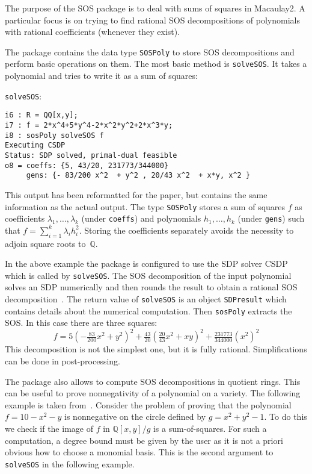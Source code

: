 \documentclass[11pt]{amsart}
\theoremstyle{plain}%
\theoremstyle{definition}
\theoremstyle{remark}
\newcommand{\SOS}{\textsc{SOS}\xspace}
\newcommand{\QQ}{\mathbb{Q}}
\begin{document}
The purpose of the \SOS package is to deal with sums of squares in Macaulay2.
A particular focus is on trying to find rational SOS decompositions of polynomials with rational coefficients (whenever they exist).

The package contains the data type \verb|SOSPoly| to store SOS decompositions and perform basic operations on them.
The most basic method is \verb|solveSOS|.
It takes a polynomial and tries to write it as a sum of squares:
{\small
\verb|solveSOS|:
\begin{verbatim}
i6 : R = QQ[x,y];
i7 : f = 2*x^4+5*y^4-2*x^2*y^2+2*x^3*y;
i8 : sosPoly solveSOS f
Executing CSDP
Status: SDP solved, primal-dual feasible
o8 = coeffs: {5, 43/20, 231773/344000}              
     gens: {- 83/200 x^2  + y^2 , 20/43 x^2  + x*y, x^2 }
\end{verbatim}
}
This output has been reformatted for the paper, but contains the same information as the actual output.
The type \verb|SOSPoly| stores a sum of squares $f$ as coefficients $\lambda_{1},\dots,\lambda_{k}$ (under \verb|coeffs|) and polynomials $h_{1},\dots,h_{k}$ (under \verb|gens|) such that $f = \sum_{i=1}^{k}\lambda_{i}h_{i}^{2}$.
Storing the coefficients separately avoids the necessity to adjoin square roots to~$\QQ$.

In the above example the package is configured to use the SDP solver CSDP which is called by \verb|solveSOS|.
The SOS decomposition of the input polynomial solves an SDP numerically and then rounds the result to obtain a rational SOS decomposition~\cite{peyrl2008computing}.
The return value of \verb|solveSOS| is an object \verb|SDPresult| which contains details about the numerical computation.
Then \verb|sosPoly| extracts the SOS.
In this case there are three squares:
\[
  f = 5(-\tfrac{83}{200} x^{2}+y^{2})^{2} + \tfrac{43}{20}
  (\tfrac{20}{43}x^{2} + xy)^{2} + \tfrac{231773}{344000} (x^{2})^{2}
\]
This decomposition is not the simplest one, but it is fully rational. 
Simplifications can be done in post-processing.

The package also allows to compute SOS decompositions in quotient rings.
This can be useful to prove nonnegativity of a polynomial on a variety.  
The following example is taken from~\cite{parrilo2005exploiting}.  
Consider the problem of proving that the polynomial $f = 10-x^2-y$ is nonnegative on the circle defined by $g = x^2 + y^2 - 1$.
To do this we check if the image of $f$ in $\QQ[x,y]/g$ is a sum-of-squares.
For such a computation, a degree bound must be given by the user as it is not a priori obvious how to choose a monomial basis.
This is the second argument to \verb|solveSOS| in the following example.
\end{document}
